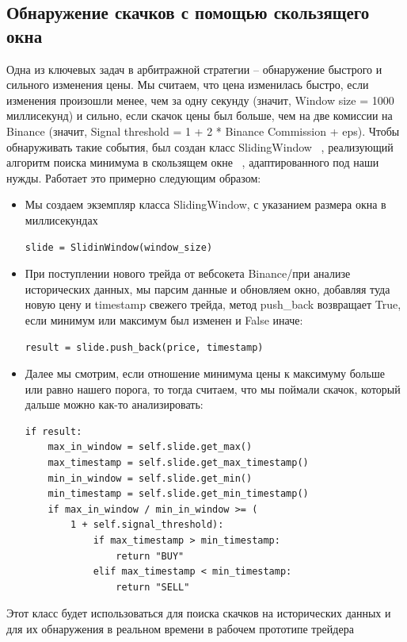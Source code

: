 \subsection{Обнаружение скачков с помощью скользящего окна}
Одна из ключевых задач в арбитражной стратегии -- обнаружение быстрого и сильного изменения цены. Мы считаем, что цена изменилась быстро, если изменения произошли менее, чем за одну секунду (значит, Window size = 1000 миллисекунд) и сильно, если скачок цены был больше, чем на две комиссии на Binance (значит, Signal threshold = 1 + 2 * Binance Commission + eps). Чтобы обнаруживать такие события, был создан класс SlidingWindow ~\cite{SlidingWindowClass}, реализующий алгоритм поиска минимума в скользящем окне ~\cite{SlidingWindowAlgorithm}, адаптированного под наши нужды. Работает это примерно следующим образом:
\begin{itemize}
\item Мы создаем экземпляр класса SlidingWindow, с указанием размера окна в миллисекундах
\begin{verbatim}
slide = SlidinWindow(window_size)
\end{verbatim}

\item При поступлении нового трейда от вебсокета Binance/при анализе исторических данных, мы парсим данные и обновляем окно, добавляя туда новую цену и timestamp свежего трейда, метод push\_back возвращает True, если минимум или максимум был изменен и False иначе:
\begin{verbatim}
result = slide.push_back(price, timestamp)
\end{verbatim}

\item Далее мы смотрим, если отношение минимума цены к максимуму больше или равно нашего порога, то тогда считаем, что мы поймали скачок, который дальше можно как-то анализировать:
\begin{verbatim}
if result:
    max_in_window = self.slide.get_max()
    max_timestamp = self.slide.get_max_timestamp()
    min_in_window = self.slide.get_min()
    min_timestamp = self.slide.get_min_timestamp()
    if max_in_window / min_in_window >= (
        1 + self.signal_threshold):
            if max_timestamp > min_timestamp:
                return "BUY"
            elif max_timestamp < min_timestamp:
                return "SELL"
\end{verbatim}
\end{itemize}

Этот класс будет использоваться для поиска скачков на исторических данных и для их обнаружения в реальном времени в рабочем прототипе трейдера

